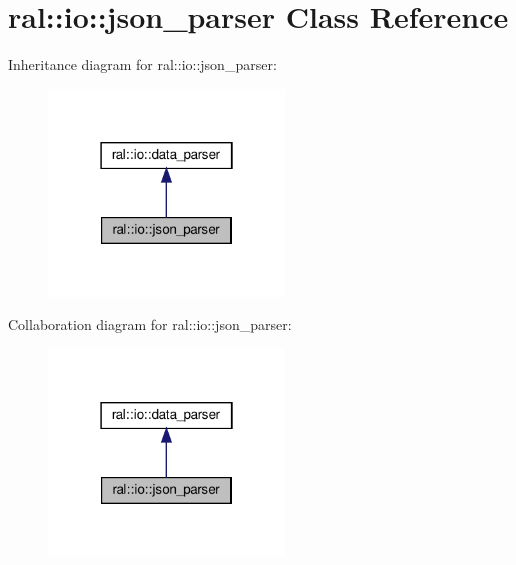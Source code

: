 \hypertarget{classral_1_1io_1_1json__parser}{}\section{ral\+:\+:io\+:\+:json\+\_\+parser Class Reference}
\label{classral_1_1io_1_1json__parser}


Inheritance diagram for ral\+:\+:io\+:\+:json\+\_\+parser\+:\nopagebreak
\begin{figure}[H]
\begin{center}
\leavevmode
\includegraphics[width=178pt]{classral_1_1io_1_1json__parser__inherit__graph}
\end{center}
\end{figure}


Collaboration diagram for ral\+:\+:io\+:\+:json\+\_\+parser\+:\nopagebreak
\begin{figure}[H]
\begin{center}
\leavevmode
\includegraphics[width=178pt]{classral_1_1io_1_1json__parser__coll__graph}
\end{center}
\end{figure}
